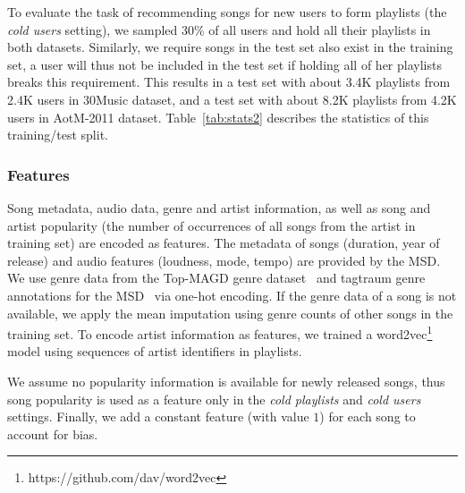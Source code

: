 To evaluate the task of recommending songs for new users to form playlists (\ie the \emph{cold users} setting),
we sampled 30\% of all users and hold all their playlists in both datasets.
Similarly, we require songs in the test set also exist in the training set,
a user will thus not be included in the test set if holding all of her playlists breaks this requirement.
This results in a test set with about 3.4K playlists from 2.4K users in 30Music dataset,
and a test set with about 8.2K playlists from 4.2K users in AotM-2011 dataset.
Table~\ref{tab:stats2} describes the statistics of this training/test split.


\subsubsection{Features}
Song metadata, audio data, genre and artist information, as well as song and 
artist popularity (\ie the number of occurrences of all songs from the artist in training set)
are encoded as features.
%
The metadata of songs (\eg duration, year of release) and audio features (\eg loudness, mode, tempo) are provided by the MSD.
We use genre data from the Top-MAGD genre dataset~\cite{schindler2012facilitating}
and tagtraum genre annotations for the MSD~\cite{schreiber2015improving} via one-hot encoding.
If the genre data of a song is not available, we apply the mean imputation using genre counts of other songs in the training set.
To encode artist information as features,
we trained a word2vec\footnote{https://github.com/dav/word2vec} model using sequences of artist identifiers in playlists.

We assume no popularity information is available for newly released songs,
thus song popularity is used as a feature only in the \emph{cold playlists} and \emph{cold users} settings.
Finally, we add a constant feature (with value $1$) for each song to account for bias.




